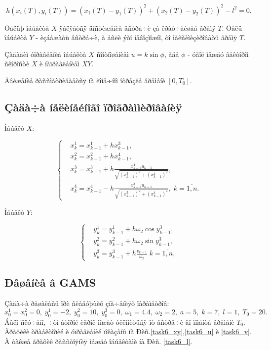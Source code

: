 \documentclass[14pt]{article}
\begin{document}
$$
    h(x_i(T),y_i(T)) = (x_1(T)-y_1(T))^2 + (x_2(T)-y_2(T))^2 - l^2 = 0.
$$

Öåëüþ îáúåêòà $X$ ÿâëÿåòñÿ äîñòèæåíèå âñòðå÷è çà êðàò÷àéøåå âðåìÿ $T$. Öåëü îáúåêòà $Y$ - èçáåæàòü âñòðå÷è, à åñëè ýòî íåâîçìîæíî, òî ìàêñèìèçèðîâàòü âðåìÿ $T$.

Çàäàäèì óïðàâëåíèå îáúåêòà $X$ ñîîòíîøåíèåì $u = k\sin{\phi}$, ãäå $\phi$ - óãîë ìåæäó âåêòîðîì ñêîðîñòè $X$ è íàïðàâëåíèåì $XY$.

Äâèæåíèå ðàññìàòðèâàåòñÿ íà êîíå÷íîì îòðåçêå âðåìåíè $[0,T_0]$.

\subsection{Çàäà÷à íåëèíåéíîãî ïðîãðàììèðîâàíèÿ}

Îáúåêò $X$:

\begin{equation}\label{NLP6}
\left\{ \begin{aligned}
& x^1_{k} = x^1_{k-1} + h x^3_{k-1}, \\
& x^2_{k} = x^2_{k-1} + h x^4_{k-1}, \\
& x^3_{k} = x^3_{k-1} + h \frac{x^4_{k-1} u_{k-1} }{\sqrt{(x^3_{k-1})^2+(x^4_{k-1})^2}} , \\
& x^4_{k} = x^4_{k-1} - h \frac{x^3_{k-1} u_{k-1} }{\sqrt{(x^3_{k-1})^2+(x^4_{k-1})^2}} , \; k = \overline{1,n}.
\end{aligned}\right.
\end{equation}


Îáúåêò $Y$:

\begin{equation}\label{NLP62}
\left\{ \begin{aligned}
& y^1_{k} = y^1_{k-1} + h \omega_2 \cos{y^3_{k-1}}, \\
& y^2_{k} = y^2_{k-1} + h \omega_2 \sin{y^3_{k-1}}, \\
& y^3_{k} = y^3_{k-1} + h \frac{v_{k-1}}{\omega_2} \; k = \overline{1,n},
\end{aligned}\right.
\end{equation}


\subsection{Ðåøåíèå â GAMS}

Çàäà÷à ðåøàëàñü ïðè ñëåäóþùèõ çíà÷åíèÿõ ïàðàìåòðîâ:
$$x^1_0 = x^2_0 = 0,\; y^1_0 = -2,\; y^2_0 = 10,\; y^3_0 =0,\; \omega_1 = 4.4,\; \omega_2 = 2,\;a=5,\;k=7,\; l=1,\; T_0 =20.$$
Áûëî ïîëó÷åíî, ÷òî âòîðîé èãðîê ìîæåò óêëîíèòüñÿ îò âñòðå÷è äî ìîìåíòà âðåìåíè $T_0$. Ãðàôèêè òðàåêòîðèé è óïðàâëåíèé ïîêàçàíû íà Ðèñ.\ref{task6_xy},\ref{task6_u} è \ref{task6_v}. À òàêæå ãðàôèê ðàññòîÿíèÿ ìåæäó îáúåêòàìè íà Ðèñ. \ref{task6_l}.
\end{document}
